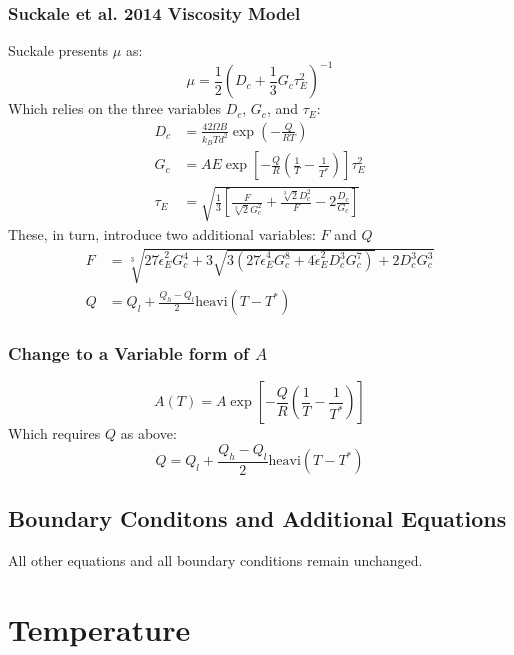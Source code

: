 \documentclass[10pt, letterpaper, twoside]{article}
\begin{document}
	\subsubsection{Suckale et al. 2014 Viscosity Model}
	Suckale presents $ \mu $ as:
	\begin{equation*}
		\mu = \frac{1}{2}\left(D_c + \frac{1}{3}G_c\tau_{\scriptscriptstyle E}^2\right)^{-1}
	\end{equation*}
	Which relies on the three variables $ D_c $, $ G_c $, and $ \tau_{\scriptscriptstyle E} $:
	\begin{align*}
		D_c& = \frac{42\Omega B}{k_BTd^2}\exp\left(-\frac{Q}{RT}\right)\\
		G_c& = AE\exp\left[-\frac{Q}{R}\left(\frac{1}{T}-\frac{1}{T^\ast}\right)\right]\tau_{\scriptscriptstyle E}^2\\
		\tau_{\scriptscriptstyle E}& = \sqrt{\frac{1}{3}\left[\frac{F}{\sqrt[3]{2}G_c^2}+\frac{\sqrt[3]{2}D_c^2}{F}-2\frac{D_c}{G_c}\right]}
	\end{align*}
	These, in turn, introduce two additional variables: $ F $ and $ Q $
	\begin{align*}
		F& = \sqrt[3]{27\dot{\epsilon}_{\scriptscriptstyle E}^2G_c^4 + 3\sqrt{3\left(27\dot{\epsilon}_{\scriptscriptstyle E}^4G_c^8 + 4\dot{\epsilon}_{\scriptscriptstyle E}^2D_c^3G_c^7\right)} + 2D_c^3G_c^3}\\
		Q& = Q_l + \frac{Q_h-Q_l}{2}\text{heavi}\left(T-T^\ast\right)
	\end{align*}
	\subsubsection{Change to a Variable form of $ A $}
	\begin{equation*}
		A\left(T\right) = A\exp\left[-\frac{Q}{R}\left(\frac{1}{T}-\frac{1}{T^\ast}\right)\right]
	\end{equation*}
	Which requires $ Q $ as above:
	\begin{equation*}
		Q = Q_l + \frac{Q_h-Q_l}{2}\text{heavi}\left(T-T^\ast\right)
	\end{equation*}
	\subsection{Boundary Conditons and Additional Equations}
	All other equations and all boundary conditions remain unchanged.
	
	\section{Temperature}
\end{document}
